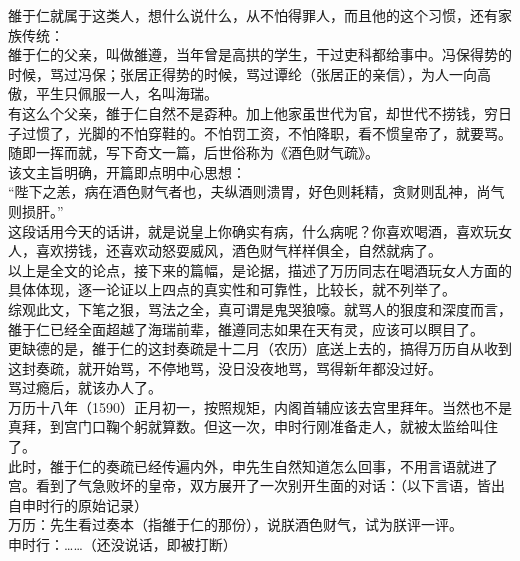 \begin{multicols}{\theparacolNo}
雒于仁就属于这类人，想什么说什么，从不怕得罪人，而且他的这个习惯，还有家族传统：\\

雒于仁的父亲，叫做雒遵，当年曾是高拱的学生，干过吏科都给事中。冯保得势的时候，骂过冯保；张居正得势的时候，骂过谭纶（张居正的亲信），为人一向高傲，平生只佩服一人，名叫海瑞。\\

有这么个父亲，雒于仁自然不是孬种。加上他家虽世代为官，却世代不捞钱，穷日子过惯了，光脚的不怕穿鞋的。不怕罚工资，不怕降职，看不惯皇帝了，就要骂。随即一挥而就，写下奇文一篇，后世俗称为《酒色财气疏》。\\

该文主旨明确，开篇即点明中心思想：\\

“陛下之恙，病在酒色财气者也，夫纵酒则溃胃，好色则耗精，贪财则乱神，尚气则损肝。”\\

这段话用今天的话讲，就是说皇上你确实有病，什么病呢？你喜欢喝酒，喜欢玩女人，喜欢捞钱，还喜欢动怒耍威风，酒色财气样样俱全，自然就病了。\\

以上是全文的论点，接下来的篇幅，是论据，描述了万历同志在喝酒玩女人方面的具体体现，逐一论证以上四点的真实性和可靠性，比较长，就不列举了。\\

综观此文，下笔之狠，骂法之全，真可谓是鬼哭狼嚎。就骂人的狠度和深度而言，雒于仁已经全面超越了海瑞前辈，雒遵同志如果在天有灵，应该可以瞑目了。\\

更缺德的是，雒于仁的这封奏疏是十二月（农历）底送上去的，搞得万历自从收到这封奏疏，就开始骂，不停地骂，没日没夜地骂，骂得新年都没过好。\\

骂过瘾后，就该办人了。\\

万历十八年（1590）正月初一，按照规矩，内阁首辅应该去宫里拜年。当然也不是真拜，到宫门口鞠个躬就算数。但这一次，申时行刚准备走人，就被太监给叫住了。\\

此时，雒于仁的奏疏已经传遍内外，申先生自然知道怎么回事，不用言语就进了宫。看到了气急败坏的皇帝，双方展开了一次别开生面的对话：（以下言语，皆出自申时行的原始记录）\\

万历：先生看过奏本（指雒于仁的那份），说朕酒色财气，试为朕评一评。\\

申时行：……（还没说话，即被打断）\\


\end{multicols}
